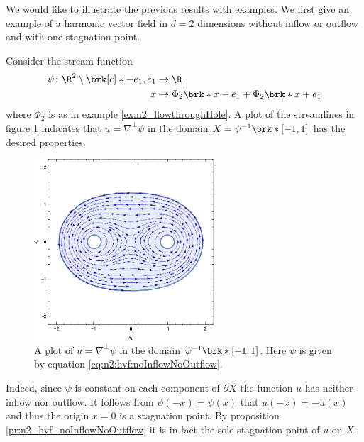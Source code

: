 We would like to illustrate the previous results with examples.
We first give an example of a harmonic vector field in $d=2$ dimensions without 
inflow or outflow and with one stagnation point.
\begin{example}[No in- or outflow]
  Consider the stream function
  \begin{equation}
    \begin{aligned}
    \psi\colon\R^2\setminus\brk[c]*{-e_1,e_1}&\to\R \\
    x&\mapsto\Phi_2\brk*{x-e_1}+\Phi_2\brk*{x+e_1}
    \end{aligned}\label{eq:n2:hvf:noInflowNoOutflow}
  \end{equation}
  where $\Phi_2$ is as in example \ref{ex:n2_flowthroughHole}.
  A plot of the streamlines in figure \ref{pl:n2_hvf_noInflowNoOutflow}
  indicates that $u=\nabla^\perp\psi$
  in the domain $X=\psi^{-1}\brk*{[-1,1]}$ has the desired properties.
  \begin{figure}
    \centering
    \includegraphics[width=0.6\textwidth]{../Plots/HarmonicVectorFields_gr1.eps}
    \caption{A plot of $u=\nabla^\perp\psi$ in the domain $\psi^{-1}\brk*{[-1,1]}$.
      Here $\psi$ is given by equation \eqref{eq:n2:hvf:noInflowNoOutflow}.}
    \label{pl:n2_hvf_noInflowNoOutflow}
  \end{figure}
  Indeed, since $\psi$ is constant on each component of $\partial X$ the function $u$ has 
  neither inflow nor outflow.
  It follows from $\psi(-x)=\psi(x)$ that $u(-x)=-u(x)$ 
  and thus the origin $x=0$ is a stagnation point.
  By proposition \ref{pr:n2_hvf_noInflowNoOutflow} it is in fact the
  sole stagnation point of $u$ on $X$.
\end{example}

